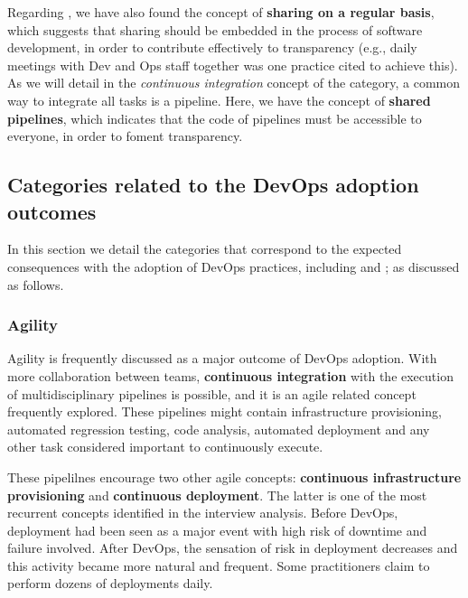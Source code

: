 Regarding , we have also found the concept of
\textbf{sharing on a regular basis}, which suggests that sharing should be
embedded in the process of software development, in order to contribute
effectively to transparency (e.g., daily meetings with Dev and Ops staff
together was one practice cited to achieve this).
As we will detail in the \emph{continuous integration} concept of
the  category, a common way to integrate all tasks is a pipeline.
Here, we have the
concept of \textbf{shared pipelines}, which indicates that the code of pipelines
must be accessible to everyone, in order to foment transparency.



\subsection{Categories related to the DevOps adoption outcomes}

In this section we detail the categories that correspond to
the expected consequences with the adoption of
DevOps practices, including  and ;
as discussed as follows.

\subsubsection{Agility}

Agility is frequently discussed as a major outcome of DevOps adoption. With more
collaboration between teams, \textbf{continuous integration} with the execution of
multidisciplinary pipelines is possible, and it is an agile related concept
frequently explored. These pipelines might contain
infrastructure provisioning, automated regression testing, code analysis,
automated deployment and any other task considered important
to continuously execute.

These pipelilnes encourage two other agile concepts: \textbf{continuous
infrastructure provisioning} and \textbf{continuous deployment}. The latter is
one of the most recurrent concepts identified in the interview analysis. Before
DevOps, deployment had been seen as a major event with high risk of downtime and
failure involved. After DevOps, the sensation of risk in deployment decreases
and this activity became more natural and frequent. Some practitioners claim
to perform dozens of deployments daily.

